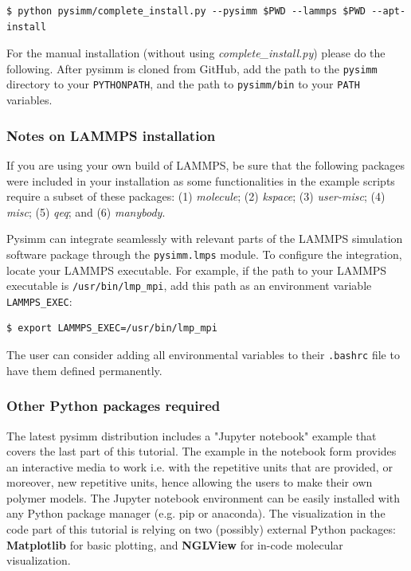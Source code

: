 \documentclass[9pt,tutorial]{livecoms}
\begin{document}
\begin{lstlisting}
$ python pysimm/complete_install.py --pysimm $PWD --lammps $PWD --apt-install 
\end{lstlisting}

For the manual installation (without using \textit{complete\_install.py}) please do the following. 
After pysimm is cloned from GitHub, add the path to the \lstinline$pysimm$ directory to your \lstinline$PYTHONPATH$, and the  path to \lstinline$pysimm/bin$ to your \lstinline$PATH$ variables. 


\subsubsection{Notes on LAMMPS installation}

If you are using your own build of LAMMPS, be sure that the following packages were included in your installation as some functionalities in the example scripts require a subset of these packages:
(1) \textit{molecule}; (2) \textit{kspace}; (3) \textit{user-misc}; (4) \textit{misc}; (5) \textit{qeq}; and (6) \textit{manybody}.

Pysimm can integrate seamlessly with relevant parts of the LAMMPS simulation software package through the \lstinline$pysimm.lmps$ module. To configure the integration, locate your LAMMPS executable. For example, if the path to your LAMMPS executable is \lstinline$/usr/bin/lmp_mpi$, add this path as an environment variable \lstinline$LAMMPS_EXEC$:

\begin{lstlisting}
$ export LAMMPS_EXEC=/usr/bin/lmp_mpi
\end{lstlisting}
The user can consider adding all environmental variables to their \lstinline$.bashrc$ file to have them defined permanently.


\subsubsection{Other Python packages required}
The latest pysimm distribution includes a "Jupyter notebook" example that covers the last part of this tutorial. The example in the notebook form provides an interactive media to work i.e. with the repetitive units that are provided, or moreover, new repetitive units, hence allowing the users to make their own polymer models. The Jupyter notebook environment can be easily installed with any Python package manager (e.g. pip or anaconda). The visualization in the code part of this tutorial is relying on two (possibly) external Python packages: \textbf{Matplotlib} for basic plotting, and \textbf{NGLView} for in-code molecular visualization.
\end{document}
